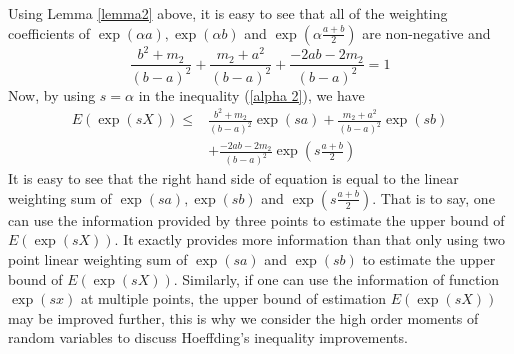 \documentclass[journal]{IEEEtran}
\newtheorem{thm}{Theorem}%
\begin{document}
Using Lemma \ref{lemma2} above, it is easy to see that all of the weighting coefficients of $\exp(\alpha a),\exp(\alpha b)$ and $\exp(\alpha \frac{a+b}{2})$
are non-negative and
\begin{equation}
  \frac{b^2+m_2}{(b-a)^2}+\frac{m_2+a^2}{(b-a)^2}+\frac{-2ab-2m_2}{(b-a)^2}=1
\end{equation}
Now, by using $s=\alpha$ in the inequality (\ref{alpha 2}), we have
\begin{equation} \label{s 2}
\begin{split}
  E(\exp(s X))\leq {}&\frac{b^2+m_2}{(b-a)^2}\exp(sa)+\frac{m_2+a^2}{(b-a)^2}\exp(sb){}\\
  &+\frac{-2ab-2m_2}{(b-a)^2}\exp(s\frac{a+b}{2})
  \end{split}
\end{equation}
It is easy to see that the right hand side of equation is equal to the linear weighting sum of $\exp(sa),\exp(sb)$ and $\exp(s\frac{a+b}{2})$. That is to say, one can use the information provided by three points to estimate the upper bound of $E(\exp(sX))$. It exactly provides more information than that only using two point linear weighting sum of $\exp(sa)$ and $\exp(sb)$ to estimate the upper bound of $E(\exp(sX))$.
Similarly, if one can use the information of function $\exp(sx)$ at multiple points, the upper bound of estimation $E(\exp(sX))$ may be improved further, this is why we consider the high order moments of random variables to discuss Hoeffding's inequality improvements.








\end{document}
